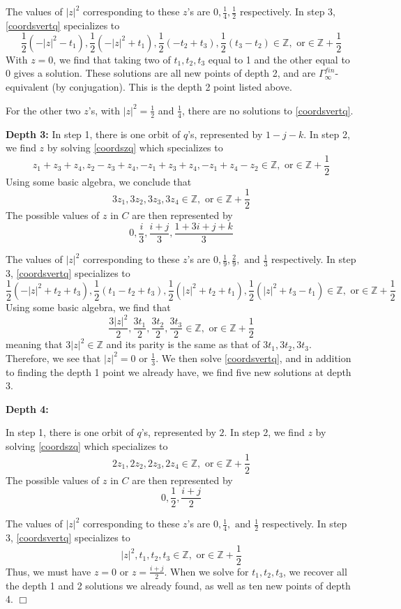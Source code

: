 \documentclass{article}[12pt]
\newcommand{\Z}{\mathbb{Z}}
\newcommand{\EPf}{\hfill$\Box$\vspace{.5cm}}
\begin{document}
The values of $|z|^2$ corresponding to these $z$'s are $0,\frac{1}{4},\frac{1}{2}$ respectively.  In step 3, \eqref{coordsvertq} specializes to 
$$\dfrac{1}{2}(-|z|^2-t_1), \dfrac{1}{2}(-|z|^2+t_1), \dfrac{1}{2}(-t_2+t_3), \dfrac{1}{2}(t_3-t_2)
 \in \Z,\text{ or}\in\Z+\frac{1}{2}$$
With $z=0$, we find that taking two of $t_1,t_2,t_3$ equal to 1 and the other equal to 0 gives a solution.  These solutions are all new points of depth 2, and are $\Gamma_\infty^{fin}$-equivalent (by conjugation).  This is the depth 2 point listed above.

For the other two $z$'s, with $|z|^2 = \frac{1}{2}$ and $\frac{1}{4}$, there are no solutions to \eqref{coordsvertq}.

{\bf Depth 3:}
In step 1, there is one orbit of $q$'s, represented by $1-j-k$.  In step 2, we find $z$ by solving \eqref{coordszq} which specializes to 
$$z_1+z_3+z_4, z_2-z_3+z_4, -z_1+z_3+z_4, -z_1+z_4-z_2 \in \Z, \text{ or}\in\Z+\frac{1}{2}$$
Using some basic algebra, we conclude that 
$$3z_1,3z_2,3z_3,3z_4\in \Z, \text{ or}\in\Z+\frac{1}{2}$$
The possible values of $z$ in $C$ are then represented by 
$$0,\frac{i}{3},\frac{i+j}{3},\frac{1+3i+j+k}{3}$$

The values of $|z|^2$ corresponding to these $z$'s are $0, \frac{1}{9}, \frac{2}{9},\text{ and }\frac{1}{3}$ respectively.  In step 3, \eqref{coordsvertq} specializes to 
$$\dfrac{1}{2}(-|z|^2+t_2+t_3), \dfrac{1}{2}(t_1-t_2+t_3), \dfrac{1}{2}(|z|^2+t_2+t_1), \dfrac{1}{2}(|z|^2+t_3-t_1) \in \Z, \text{ or}\in\Z+\frac{1}{2}$$
Using some basic algebra, we find that 
$$\frac{3|z|^2}{2}, \frac{3t_1}{2}, \frac{3t_2}{2}, \frac{3t_3}{2}\in \Z, \text{ or}\in\Z+\frac{1}{2}$$
meaning that $3|z|^2\in \Z$ and its parity is the same as that of $3t_1,3t_2,3t_3$.  Therefore, we see that $|z|^2=0$ or $\frac{1}{3}$. We then solve \eqref{coordsvertq}, and in addition to finding the depth 1 point we already have, we find five new solutions at depth 3.


{\bf Depth 4:}

In step 1, there is one orbit of $q$'s, represented by $2$.  In step 2, we find $z$ by solving \eqref{coordszq} which specializes to 
$$2z_1,2z_2,2z_3,2z_4\in \Z, \text{ or}\in\Z+\frac{1}{2}$$
The possible values of $z$ in $C$ are then represented by $$0,\frac{1}{2}, \frac{i+j}{2}$$

The values of $|z|^2$ corresponding to these $z$'s are $0, \frac{1}{4}, \text{ and }\frac{1}{2}$ respectively.  In step 3, \eqref{coordsvertq} specializes to 
$$|z|^2,t_1,t_2,t_3 \in \Z, \text{ or}\in\Z+\frac{1}{2}$$
Thus, we must have $z=0$ or $z=\frac{i+j}{2}$.  When we solve for $t_1,t_2,t_3$, we recover all the depth 1 and 2 solutions we already found, as well as ten new points of depth 4.  \EPf
\end{document}
